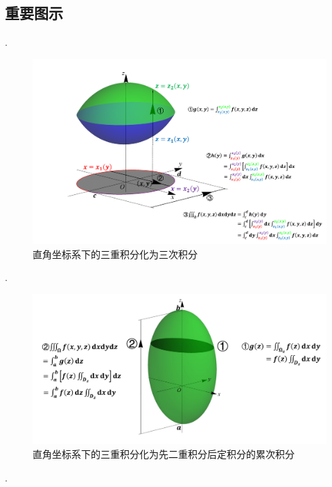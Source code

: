 \documentclass[12pt,UTF8]{ctexart}
\begin{document}
\subsection{重要图示}
\begin{enumerate}
.
\begin{figure}[H]
\begin{center}
\includegraphics[height=0.5\textheight,angle=0]{Figures20190611/D2M.pdf}
\end{center}
\caption{直角坐标系下的三重积分化为三次积分}
\end{figure}
.
\begin{figure}[H]
\begin{center}
\includegraphics[height=0.3\textheight,angle=0]{Figures20190611/M2D.pdf}
\end{center}
\caption{直角坐标系下的三重积分化为先二重积分后定积分的累次积分}
\end{figure}
.
\begin{figure}[H]
\begin{center}

\end{center}
\end{figure}
\end{enumerate}
\end{document}
